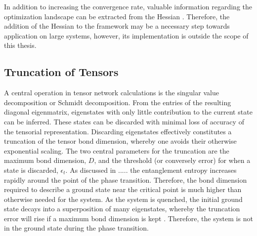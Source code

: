 In addition to increasing the convergence rate, valuable information regarding the optimization landscape can be extracted from the Hessian \cite{Shen2006}. Therefore, the addition of the Hessian to the framework may be a necessary step towards application on large systems, however, its implementation is outside the scope of this thesis.


\subsection{Truncation of Tensors}
A central operation in tensor network calculations is the singular value decomposition or Schmidt decomposition. From the entries of the resulting diagonal eigenmatrix, eigenstates with only little contribution to the current state can be inferred. These states can be discarded with minimal loss of accuracy of the tensorial representation. Discarding eigenstates effectively constitutes a truncation of the tensor bond dimension, whereby one avoids their otherwise exponential scaling. The two central parameters for the truncation are the maximum bond dimension, $D$, and the threshold (or conversely error) for when a state is discarded, $\epsilon_t$.
As discussed in ..... the entanglement entropy increases rapidly around the point of the phase transition. Therefore, the bond dimension required to describe a ground state near the critical point is much higher than otherwise needed for the system. As the system is quenched, the initial ground state decays into a superposition of many eigenstates, whereby the truncation error will rise if a maximum bond dimension is kept \cite{Daley2004}. Therefore, the system is not in the ground state during the phase transition.

